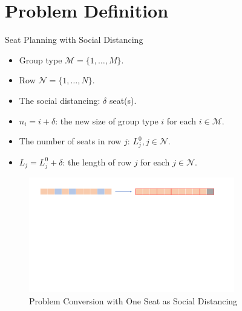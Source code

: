 
\section{Problem Definition}
    \frame{\sectionpage}

    \begin{frame}{Seat Planning with Social Distancing}
      \begin{itemize}
      \item Group type $\mathcal{M} = \{1, \ldots, M\}$.
      \item Row $\mathcal{N} = \{1, \ldots, N\}$.
      \item The social distancing: $\delta$ seat(s).
      \item $n_i = i + \delta$: the new size of group type $i$ for each $i \in \mathcal{M}$.
      \item The number of seats in row $j$: $L_j^{0}, j \in \mathcal{N}$.
      \item $L_j = L_j^{0} + \delta$: the length of row $j$ for each $j \in \mathcal{N}$.
      \end{itemize}
      
      \begin{figure}[ht]
        \centering
        \includegraphics[width = 0.8\textwidth]{./images/dummy_seat.pdf}
        \caption{Problem Conversion with One Seat as Social Distancing}
    \end{figure}
    \end{frame}

